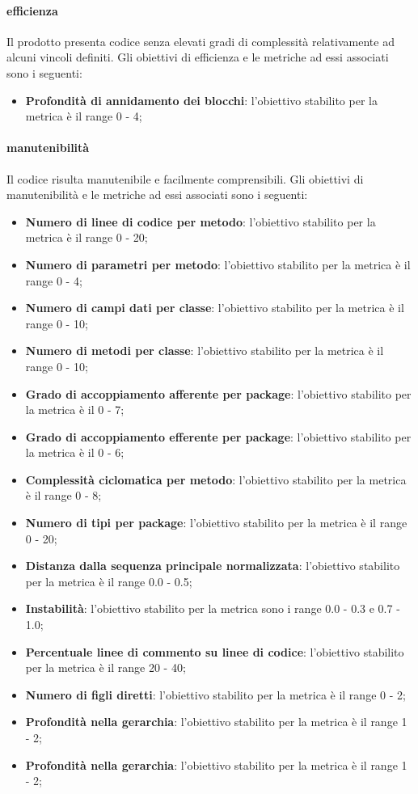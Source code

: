 		 	\paragraph{efficienza}
		 	Il prodotto presenta codice senza elevati gradi di complessità relativamente ad alcuni vincoli definiti.
		 	Gli obiettivi di efficienza e le metriche ad essi associati sono i seguenti:
		 	\begin{itemize}
				\item \textbf{Profondità di annidamento dei blocchi}: l'obiettivo stabilito per la metrica è il range 0 - 4;
			\end{itemize}
		 	\paragraph{manutenibilità}
		 	Il codice risulta manutenibile e facilmente comprensibili.
		 	Gli obiettivi di manutenibilità e le metriche ad essi associati sono i seguenti:
		 	\begin{itemize}
				\item \textbf{Numero di linee di codice per metodo}: l'obiettivo stabilito per la metrica è il range 0 - 20; 
				\item \textbf{Numero di parametri per metodo}: l'obiettivo stabilito per la metrica è il range 0 - 4;
				\item \textbf{Numero di campi dati per classe}: l'obiettivo stabilito per la metrica è il range 0 - 10;
				\item \textbf{Numero di metodi per classe}: l'obiettivo stabilito per la metrica è il range 0 - 10;
				\item \textbf{Grado di accoppiamento afferente per package}: l'obiettivo stabilito per la metrica è il 0 - 7;
				\item \textbf{Grado di accoppiamento efferente per package}: l'obiettivo stabilito per la metrica è il 0 - 6;
				\item \textbf{Complessità ciclomatica per metodo}: l'obiettivo stabilito per la metrica è il range 0 - 8;
				\item \textbf{Numero di tipi per package}: l'obiettivo stabilito per la metrica è il range 0 - 20;
				\item \textbf{Distanza dalla sequenza principale normalizzata}: l'obiettivo stabilito per la metrica è il range 0.0 - 0.5; 
				\item \textbf{Instabilità}: l'obiettivo stabilito per la metrica sono i range 0.0 - 0.3 e 0.7 - 1.0; 
				\item \textbf{Percentuale linee di commento su linee di codice}: l'obiettivo stabilito per la metrica è il range 20 - 40;	
				\item \textbf{Numero di figli diretti}: l'obiettivo stabilito per la metrica è il range 0 - 2;
				\item \textbf{Profondità nella gerarchia}: l'obiettivo stabilito per la metrica è il range 1 - 2;
				\item \textbf{Profondità nella gerarchia}: l'obiettivo stabilito per la metrica è il range 1 - 2;
			\end{itemize}
